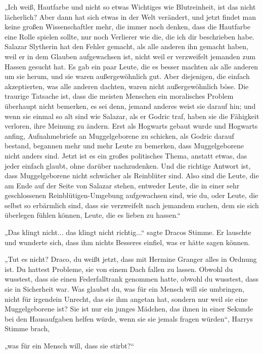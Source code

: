 {„Ich weiß, Hautfarbe und nicht so etwas Wichtiges wie Blutreinheit, ist das nicht lächerlich? Aber dann hat sich etwas in der Welt verändert, und jetzt findet man keine großen Wissenschaftler mehr, die immer noch denken, dass die Hautfarbe eine Rolle spielen sollte, nur noch Verlierer wie die, die ich dir beschrieben habe. Salazar Slytherin hat den Fehler gemacht, als alle anderen ihn gemacht haben, weil er in dem Glauben aufgewachsen ist, nicht weil er verzweifelt jemanden zum Hassen gesucht hat. Es gab ein paar Leute, die es besser machten als alle anderen um sie herum, und sie waren außergewöhnlich gut. Aber diejenigen, die einfach akzeptierten, was alle anderen dachten, waren nicht außergewöhnlich böse. Die traurige Tatsache ist, dass die meisten Menschen ein moralisches Problem überhaupt nicht bemerken, es sei denn, jemand anderes weist sie darauf hin; und wenn sie einmal so alt sind wie Salazar, als er Godric traf, haben sie die Fähigkeit verloren, ihre Meinung zu ändern. Erst als Hogwarts gebaut wurde und Hogwarts anfing, Aufnahmebriefe an Muggelgeborene zu schicken, als Godric darauf bestand, begannen mehr und mehr Leute zu bemerken, dass Muggelgeborene nicht anders sind. Jetzt ist es ein großes politisches Thema, anstatt etwas, das jeder einfach glaubt, ohne darüber nachzudenken. Und die richtige Antwort ist, dass Muggelgeborene nicht schwächer als Reinblüter sind. Also sind die Leute, die am Ende auf der Seite von Salazar stehen, entweder Leute, die in einer sehr geschlossenen Reinblütigen-Umgebung aufgewachsen sind, wie du, oder Leute, die selbst so erbärmlich sind, dass sie verzweifelt nach jemandem suchen, dem sie sich überlegen fühlen können, Leute, die es lieben zu hassen.“

„Das klingt nicht... das klingt nicht richtig...“ sagte Dracos Stimme. Er lauschte und wunderte sich, dass ihm nichts Besseres einfiel, was er hätte sagen können.

„Tut es nicht? Draco, du weißt jetzt, dass mit Hermine Granger alles in Ordnung ist. Du hattest Probleme, sie von einem Dach fallen zu lassen. Obwohl du wusstest, dass sie einen Federfalltrank genommen hatte, obwohl du wusstest, dass sie in Sicherheit war. Was glaubst du, was für ein Mensch will sie umbringen, nicht für irgendein Unrecht, das sie ihm angetan hat, sondern nur weil sie eine Muggelgeborene ist? Sie ist nur ein junges Mädchen, das ihnen in einer Sekunde bei den Hausaufgaben helfen würde, wenn sie sie jemals fragen würden“, Harrys Stimme brach,

„was für ein Mensch will, dass sie stirbt?“

}
